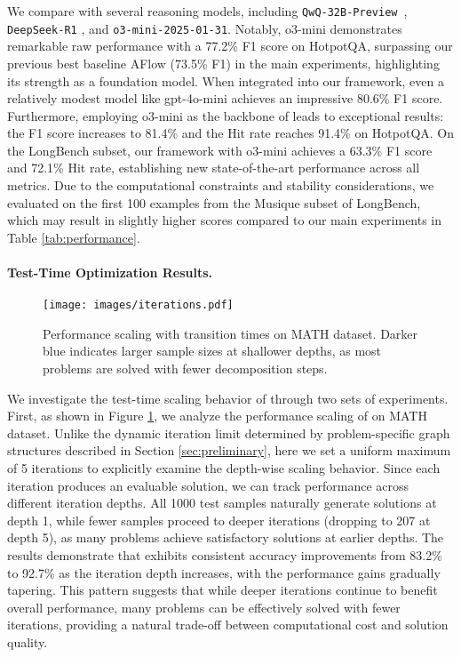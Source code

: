 We compare \our with several reasoning models, including \texttt{QwQ-32B-Preview}~\cite{QWQModel}, \texttt{DeepSeek-R1} \cite{deepseekR1Model}, and \texttt{o3-mini-2025-01-31}\cite{O3miniModel}. Notably, o3-mini demonstrates remarkable raw performance with a 77.2\% F1 score on HotpotQA, surpassing our previous best baseline AFlow (73.5\% F1) in the main experiments, highlighting its strength as a foundation model. When integrated into our framework, even a relatively modest model like gpt-4o-mini achieves an impressive 80.6\% F1 score. Furthermore, employing o3-mini as the backbone of \our leads to exceptional results: the F1 score increases to 81.4\% and the Hit rate reaches 91.4\% on HotpotQA. On the LongBench subset, our framework with o3-mini achieves a 63.3\% F1 score and 72.1\% Hit rate, establishing new state-of-the-art performance across all metrics. Due to the computational constraints and stability considerations, we evaluated on the first 100 examples from the Musique subset of LongBench, which may result in slightly higher scores compared to our main experiments in Table \ref{tab:performance}.

\paragraph{Test-Time Optimization Results.}

\begin{figure}[t!]
\centering
\texttt{[image: images/iterations.pdf]}
\vspace{-1em}
\caption{Performance scaling with transition times on MATH dataset. Darker blue indicates larger sample sizes at shallower depths, as most problems are solved with fewer decomposition steps.}
\label{fig:iterations}
\end{figure}

We investigate the test-time scaling behavior of \our through two sets of experiments. First, as shown in Figure \ref{fig:iterations}, we analyze the performance scaling of \our on MATH dataset. Unlike the dynamic iteration limit determined by problem-specific graph structures described in Section \ref{sec:preliminary}, here we set a uniform maximum of 5 iterations to explicitly examine the depth-wise scaling behavior. Since each iteration produces an evaluable solution, we can track performance across different iteration depths. All 1000 test samples naturally generate solutions at depth 1, while fewer samples proceed to deeper iterations (dropping to 207 at depth 5), as many problems achieve satisfactory solutions at earlier depths. The results demonstrate that \our exhibits consistent accuracy improvements from 83.2\% to 92.7\% as the iteration depth increases, with the performance gains gradually tapering. This pattern suggests that while deeper iterations continue to benefit overall performance, many problems can be effectively solved with fewer iterations, providing a natural trade-off between computational cost and solution quality.

